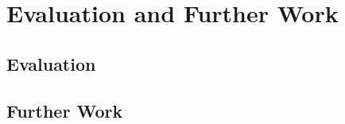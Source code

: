 \section{Evaluation and Further Work} \label{eval_and_further_work}

\subsection{Evaluation}

\subsection{Further Work}

